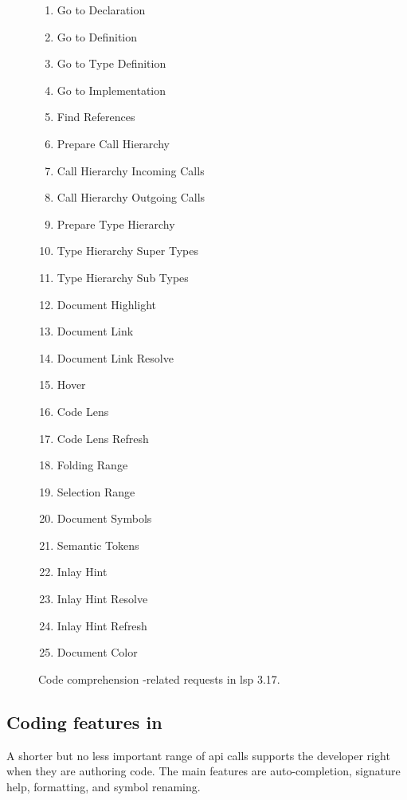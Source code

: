 \begin{figure}[t]\centering
	\begin{multicols}{2}
	\begin{enumerate}
		\item Go to Declaration
		\item Go to Definition \org
		\item Go to Type Definition
		\item Go to Implementation
		\item Find References \org
		\item Prepare Call Hierarchy
		\item Call Hierarchy Incoming Calls
		\item Call Hierarchy Outgoing Calls
		\item Prepare Type Hierarchy
		\item Type Hierarchy Super Types
		\item Type Hierarchy Sub Types
		\item Document Highlight \org
		\item Document Link \org
		\item Document Link Resolve \org
		\item Hover \org
		\item Code Lens \org
		\item Code Lens Refresh
		\item Folding Range
		\item Selection Range
		\item Document Symbols \org
		\item Semantic Tokens
		\item Inlay Hint
		\item Inlay Hint Resolve
		\item Inlay Hint Refresh
		\item Document Color
	\end{enumerate}
	\end{multicols}

	\caption{Code comprehension -related requests in \acrshort{lsp} 3.17.}
	\label{fig:comprehension-requests}
\end{figure}


\subsection{Coding features in }

A shorter but no less important range of \acrshort{api} calls supports the
developer right when they are authoring code. The main features are
auto-completion, signature help, formatting, and symbol renaming.

